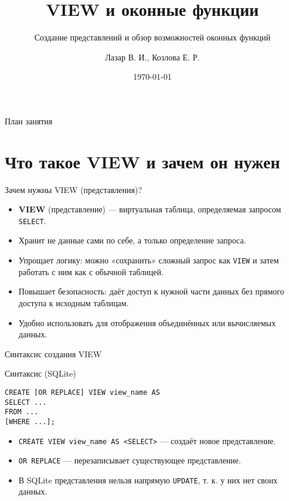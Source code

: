 \documentclass{beamer}
\title{VIEW и оконные функции}
\subtitle{Создание представлений и обзор возможностей оконных функций}
\author{Лазар В. И., Козлова Е. Р.}
\date{\today}
\begin{document}
\begin{frame}
	\titlepage
\end{frame}

\begin{frame}{План занятия}
	\tableofcontents
\end{frame}

\section{Что такое VIEW и зачем он нужен}

\begin{frame}{Зачем нужны VIEW (представления)?}
	\begin{itemize}
		\item \textbf{VIEW} (представление) — виртуальная таблица, определяемая запросом \texttt{SELECT}.
		\item Хранит не данные сами по себе, а только определение запроса.
		\item Упрощает логику: можно «сохранить» сложный запрос как \texttt{VIEW} и затем работать с ним как с обычной таблицей.
		\item Повышает безопасность: даёт доступ к нужной части данных без прямого доступа к исходным таблицам.
		\item Удобно использовать для отображения объединённых или вычисляемых данных.
	\end{itemize}
\end{frame}

\begin{frame}[fragile]{Синтаксис создания VIEW}
	\begin{block}{Синтаксис (SQLite)}
		\begin{verbatim}
CREATE [OR REPLACE] VIEW view_name AS
SELECT ...
FROM ...
[WHERE ...];
\end{verbatim}
	\end{block}
	\begin{itemize}
		\item \texttt{CREATE VIEW view\_name AS <SELECT>} — создаёт новое представление.
		\item \texttt{OR REPLACE} — перезаписывает существующее представление.
		\item В SQLite представления нельзя напрямую \texttt{UPDATE}, т. к. у них нет своих данных.
	\end{itemize}
\end{frame}
\end{document}
